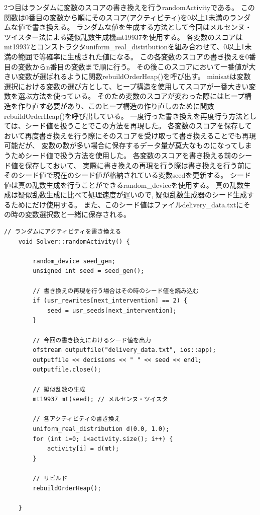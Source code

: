 2つ目はランダムに変数のスコアの書き換えを行うrandomActivityである。
この関数は0番目の変数から順にそのスコア(アクティビティ)を0以上1未満のランダムな値で書き換える。
ランダムな値を生成する方法として今回はメルセンヌ・ツイスター法による疑似乱数生成機mt19937を使用する。
各変数のスコアはmt19937とコンストラクタuniform\_real\_distributionを組み合わせて、0以上1未満の範囲で等確率に生成された値になる。
この各変数のスコアの書き換えを0番目の変数からn番目の変数まで順に行う。
その後このスコアにおいて一番値が大きい変数が選ばれるように関数rebuildOrderHeap()を呼び出す。
minisatは変数選択における変数の選び方として、ヒープ構造を使用してスコアが一番大きい変数を選ぶ方法を使っている。
そのため変数のスコアが変わった際にはヒープ構造を作り直す必要があり、このヒープ構造の作り直しのために関数rebuildOrderHeap()を呼び出している。
一度行った書き換えを再度行う方法としては、シード値を扱うことでこの方法を再現した。
各変数のスコアを保存しておいて再度書き換えを行う際にそのスコアを受け取って書き換えることでも再現可能だが、
変数の数が多い場合に保存するデータ量が莫大なものになってしまうためシード値で扱う方法を使用した。
各変数のスコアを書き換える前のシード値を保存しておいて、
実際に書き換えの再現を行う際は書き換えを行う前にそのシード値で現在のシード値が格納されている変数seedを更新する。
シード値は真の乱数生成を行うことができるrandom\_deviceを使用する。
真の乱数生成は疑似乱数生成に比べて処理速度が遅いので, 疑似乱数生成器のシード生成するためにだけ使用する。
また、このシード値はファイルdelivery\_data.txtにその時の変数選択数と一緒に保存される。
\begin{lstlisting}[caption=関数randomActivity(core/Solver.cc)]
	// ランダムにアクティビティを書き換える
	void Solver::randomActivity() {

    	random_device seed_gen;
    	unsigned int seed = seed_gen();

		// 書き換えの再現を行う場合はその時のシード値を読み込む
    	if (usr_rewrites[next_intervention] == 2) {
    	    seed = usr_seeds[next_intervention];
    	}

		// 今回の書き換えにおけるシード値を出力
    	ofstream outputfile("delivery_data.txt", ios::app);
    	outputfile << decisions << " " << seed << endl;
    	outputfile.close();

    	// 擬似乱数の生成
    	mt19937 mt(seed); // メルセンヌ・ツイスタ

    	// 各アクティビティの書き換え
    	uniform_real_distribution d(0.0, 1.0);
    	for (int i=0; i<activity.size(); i++) {
    	    activity[i] = d(mt);
    	}
    
    	// リビルド
    	rebuildOrderHeap();

	}
\end{lstlisting}

